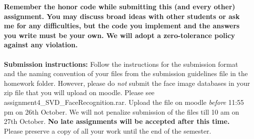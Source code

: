 \documentclass[11pt]{article}
\begin{document}
\maketitle

\textbf{Remember the honor code while submitting this (and every other) assignment. You may discuss broad ideas with other students or ask me for any difficulties, but the code you implement and the answers you write must be your own. We will adopt a \textbf{zero-tolerance policy} against any violation.}
\\
\\
\textbf{Submission instructions:} Follow the instructions for the submission format and the naming convention of your files from the submission guidelines file in the homework folder. However, please do \emph{not} submit the face image databases in your zip file that you will upload on moodle. Please see \textsf{assignment4\_SVD\_FaceRecognition.rar}. Upload the file on moodle \emph{before} 11:55 pm on 26th October.  We will not penalize submission of the files till 10 am on 27th October. \textbf{No late assignments will be accepted after this time.} Please preserve a copy of all your work until the end of the semester.  
\end{document}
